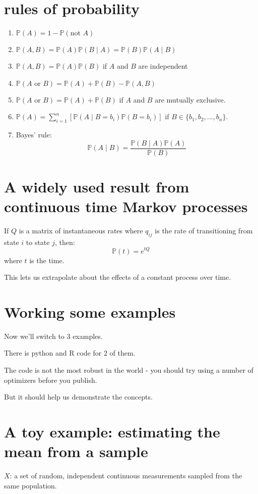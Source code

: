 \documentclass[landscape]{foils}
\renewcommand{\Pr}{\mathbb{P}}
\begin{document}
\section*{rules of probability}
\begin{enumerate}
  \item $\Pr(A) = 1 - \Pr(\mbox{not } A)$
  \item $\Pr(A,B) = \Pr(A)\Pr(B\mid A) = \Pr(B)\Pr(A\mid B)$
  \item $\Pr(A,B) = \Pr(A)\Pr(B)$ if $A$ and $B$ are independent
  \item $\Pr(A\mbox{ or } B) = \Pr(A) + \Pr(B) - \Pr(A,B)$
  \item $\Pr(A\mbox{ or } B) = \Pr(A) + \Pr(B)$ if $A$ and $B$ are mutually exclusive.
  \item $\Pr(A) = \sum_{i=1}^n\left[\Pr(A\mid B=b_i)\Pr(B=b_i)\right]$ if $B \in \{b_1, b_2,\ldots, b_n\}$.
  \item Bayes' rule:$$\Pr(A\mid B) = \frac{\Pr(B\mid A)\Pr(A)}{\Pr(B)}$$
\end{enumerate}

\myNewSlide
\section*{A widely used result from continuous time Markov processes}

If $Q$ is a matrix of instantaneous rates where $q_{ij}$ is the rate
of transitioning from state $i$ to state $j$, then:
$$\Pr(t) = e^{tQ}$$
where $t$ is the time.

This lets us extrapolate about the effects of a constant process over time.

\myNewSlide
\section*{Working some examples}
Now we'll switch to 3 examples.

There is python and R code for 2 of them.

The code is not the most robust in the world - you should try using a number
of optimizers before you publish.

But it should help us demonstrate the concepts.

\myNewSlide
\section*{A toy example: estimating the mean from a sample}
$X$: a set of random, independent continuous measurements sampled from the same population.
\end{document}
